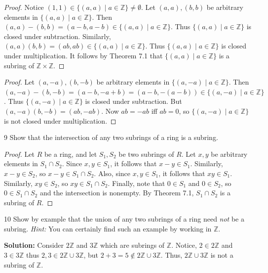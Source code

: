 \begin{proof}
    Notice $(1, 1) \in \{(a, a) \mid a \in \mathbb{Z}\} \ne \emptyset$.
    Let $(a, a), (b, b)$ be arbitrary elements in $\{(a, a) \mid a \in \mathbb{Z}\}$.
    Then $(a, a) - (b, b) = (a - b, a - b) \in \{(a, a) \mid a \in \mathbb{Z}\}$.
    Thus $\{(a, a) \mid a \in \mathbb{Z}\}$ is closed under subtraction.
    Similarly, $(a, a)(b, b) = (ab, ab) \in \{(a, a) \mid a \in \mathbb{Z}\}$.
    Thus $\{(a, a) \mid a \in \mathbb{Z}\}$ is closed under multiplication.
    It follows by Theorem 7.1 that $\{(a, a) \mid a \in \mathbb{Z}\}$ is a subring of $\mathbb{Z} \times \mathbb{Z}$.
\end{proof}

\begin{proof}
    Let $(a, -a), (b, -b)$ be arbitrary elements in $\{(a, -a) \mid a \in \mathbb{Z}\}$.
    Then $(a, -a) - (b, -b) = (a - b, -a + b) = (a - b, -(a - b)) \in \{(a, -a) \mid a \in \mathbb{Z}\}$.
    Thus $\{(a, -a) \mid a \in \mathbb{Z}\}$ is closed under subtraction.
    But $(a, -a)(b, -b) = (ab, -ab)$. Now $ab = -ab$ iff $ab = 0$, 
    so $\{(a, -a) \mid a \in \mathbb{Z}\}$ is not closed under multiplication.
\end{proof}

\begin{problem}{9}
    Show that the intersection of any two subrings of a ring is a subring.
\end{problem}
\solved

\begin{proof}
    Let $R$ be a ring, and let $S_1, S_2$ be two subrings of $R$.
    Let $x, y$ be arbitrary elements in $S_1 \cap S_2$.
    Since $x, y \in S_1$, it follows that $x - y \in S_1$.
    Similarly, $x - y \in S_2$, so $x - y \in S_1 \cap S_2$.
    Also, since $x, y \in S_1$, it follows that $xy \in S_1$.
    Similarly, $xy \in S_2$, so $xy \in S_1 \cap S_2$.
    Finally, note that $0 \in S_1$ and $0 \in S_2$, so $0 \in S_1 \cap S_2$ and the intersection is nonempty.
    By Theorem 7.1, $S_1 \cap S_2$ is a subring of $R$.
\end{proof}

\begin{problem}{10}
    Show by example that the union of any two subrings of a ring need \emph{not}
    be a subring. \emph{Hint: } You can certainly find such an example by working in $\mathbb{Z}$.
\end{problem}
\solved

\textbf{Solution:}
Consider $2\mathbb{Z}$ and $3\mathbb{Z}$ which are subrings of $\mathbb{Z}$.
Notice, $2 \in 2\mathbb{Z}$ and $3 \in 3\mathbb{Z}$ thus $2, 3 \in 2\mathbb{Z} \cup 3 \mathbb{Z}$, 
    but $2 + 3 = 5 \notin 2\mathbb{Z} \cup 3\mathbb{Z}$.
Thus, $2\mathbb{Z} \cup 3\mathbb{Z}$ is not a subring of $\mathbb{Z}$.

